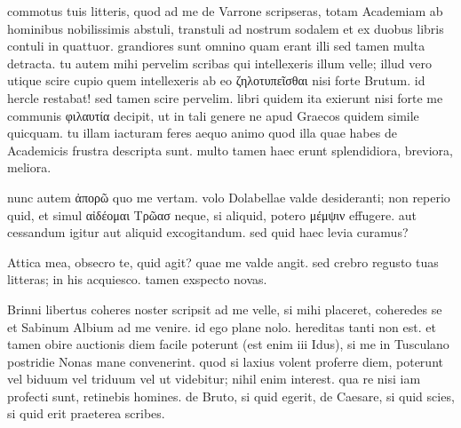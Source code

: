 


 commotus tuis litteris, quod ad me de Varrone scripseras, totam Academiam ab hominibus nobilissimis abstuli, transtuli ad nostrum sodalem et ex duobus libris contuli in quattuor. grandiores sunt omnino quam erant illi sed tamen multa detracta. tu autem mihi pervelim scribas qui intellexeris illum velle; illud vero utique scire cupio quem intellexeris ab eo ζηλοτυπεῖσθαι nisi forte Brutum. id hercle restabat! sed tamen scire pervelim. libri quidem ita exierunt nisi forte me communis φιλαυτία decipit, ut in tali genere ne apud Graecos quidem simile quicquam. tu illam iacturam feres aequo animo quod illa quae habes de Academicis frustra descripta sunt. multo tamen haec erunt splendidiora, breviora, meliora.

 nunc autem ἀπορῶ quo me vertam. volo Dolabellae valde desideranti; non reperio quid, et simul αἰδέομαι Τρῶασ neque, si aliquid, potero μέμψιν effugere. aut cessandum igitur aut aliquid excogitandum. sed quid haec levia curamus?

 Attica mea, obsecro te, quid agit? quae me valde angit. sed crebro regusto tuas litteras; in his acquiesco. tamen exspecto novas.

 Brinni libertus coheres noster scripsit ad me velle, si mihi placeret, coheredes se et Sabinum Albium ad me venire. id ego plane nolo. hereditas tanti non est. et tamen obire auctionis diem facile poterunt (est enim iii Idus), si me in Tusculano postridie Nonas mane convenerint. quod si laxius volent proferre diem, poterunt vel biduum vel triduum vel ut videbitur; nihil enim interest. qua re nisi iam profecti sunt, retinebis homines. de Bruto, si quid egerit, de Caesare, si quid scies, si quid erit praeterea scribes.
